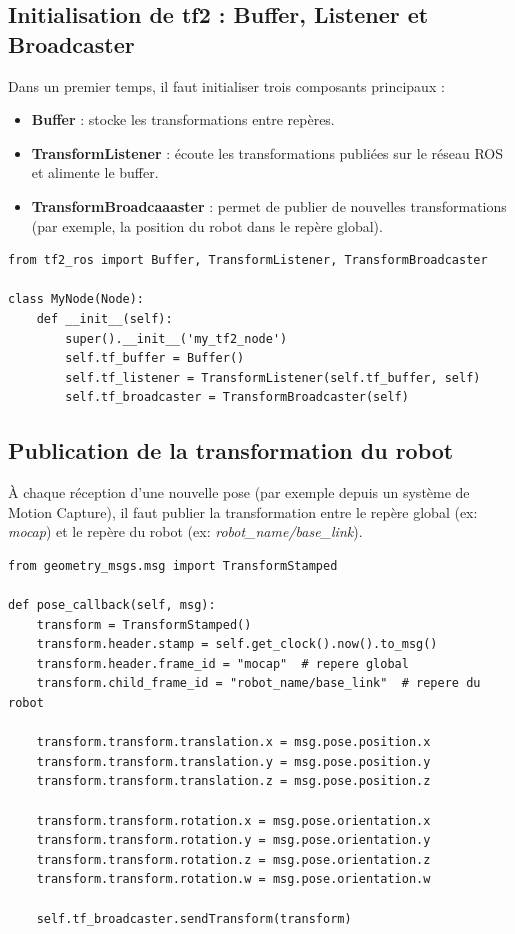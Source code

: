 \subsection{Initialisation de tf2 : Buffer, Listener et Broadcaster}

\noindent Dans un premier temps, il faut initialiser trois composants principaux :
\begin{itemize}
    \item \textbf{Buffer} : stocke les transformations entre repères.
    \item \textbf{TransformListener} : écoute les transformations publiées sur le réseau ROS et alimente le buffer.
    \item \textbf{TransformBroadcaaaster} : permet de publier de nouvelles transformations (par exemple, la position du robot dans le repère global).
\end{itemize}
\vspace{0.1cm}

\begin{lstlisting}[style=commandstyle, caption={Initialisation de tf2 dans un nœud ROS2}]
from tf2_ros import Buffer, TransformListener, TransformBroadcaster

class MyNode(Node):
    def __init__(self):
        super().__init__('my_tf2_node')
        self.tf_buffer = Buffer()
        self.tf_listener = TransformListener(self.tf_buffer, self)
        self.tf_broadcaster = TransformBroadcaster(self)
\end{lstlisting}

\subsection{Publication de la transformation du robot}

À chaque réception d'une nouvelle pose (par exemple depuis un système de Motion Capture), il faut publier la transformation entre le repère global (ex: \textit{mocap}) et le repère du robot (ex: \textit{robot\_name/base\_link}). 
\hspace{0.2cm}
\begin{lstlisting}[style=commandstyle, caption={Publication de la transformation à partir de la pose}]
from geometry_msgs.msg import TransformStamped

def pose_callback(self, msg):
    transform = TransformStamped()
    transform.header.stamp = self.get_clock().now().to_msg()
    transform.header.frame_id = "mocap"  # repere global
    transform.child_frame_id = "robot_name/base_link"  # repere du robot

    transform.transform.translation.x = msg.pose.position.x
    transform.transform.translation.y = msg.pose.position.y
    transform.transform.translation.z = msg.pose.position.z

    transform.transform.rotation.x = msg.pose.orientation.x
    transform.transform.rotation.y = msg.pose.orientation.y
    transform.transform.rotation.z = msg.pose.orientation.z
    transform.transform.rotation.w = msg.pose.orientation.w

    self.tf_broadcaster.sendTransform(transform)
\end{lstlisting}

